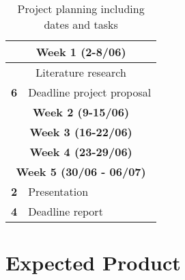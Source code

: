 \documentclass[a4paper,8pt]{article}
\begin{document}
\begin{table}[H]
\small
\caption{Project planning including dates and tasks}
\label{table:planning}
\begin{tabular}{|l|l|}

\hline
\multicolumn{2}{|c|}{\textbf{Week 1 (2-8/06)}}\\
\hline
\multicolumn{2}{|c|}{Literature research}\\
\hline
\textbf{6} & Deadline project proposal\\ 
\hline
\multicolumn{2}{|c|}{\textbf{Week 2 (9-15/06)}}\\
\hline

\multicolumn{2}{|c|}{\textbf{Week 3 (16-22/06)}}\\
\hline

\multicolumn{2}{|c|}{\textbf{Week 4 (23-29/06)}}\\
\hline
\multicolumn{2}{|c|}{\textbf{Week 5 (30/06 - 06/07)}}\\
\hline
\textbf{2} & Presentation\\
\textbf{4} & Deadline report\\
\hline

\hline
\end{tabular}
\end{table}

\section*{Expected Product}



\pagebreak

{}

\end{document}

